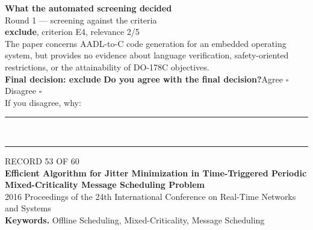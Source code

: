 \documentclass[11pt,a4paper]{article}
\begin{document}
\vspace{3mm}
\vspace{2.5mm}
{\small\textbf{What the automated screening decided}}\\[2mm]
{\footnotesize\color{soft}Round 1 --- screening against the criteria}\\[0.5mm]
{\small\textbf{exclude}, criterion E4, relevance 2/5}\\[0.5mm]
{\small The paper concerns AADL-to-C code generation for an embedded operating system, but provides no evidence about language verification, safety-oriented restrictions, or the attainability of DO-178C objectives.}\\[2.5mm]
{\small\textbf{Final decision: exclude}}
\vspace{2mm}
{\small\textbf{Do you agree with the final decision?}\quad{}Agree $\square$\qquad{}Disagree $\square$}\\[1mm]
{\footnotesize\color{soft}If you disagree, why:}\\[1mm]
\color{rule}\rule{\linewidth}{0.3pt}\\[3mm]\rule{\linewidth}{0.3pt}\color{black}
\clearpage
{\color{soft}\footnotesize RECORD 53 OF 60}\\[1mm]
{\large\bfseries Efficient Algorithm for Jitter Minimization in Time-Triggered Periodic Mixed-Criticality Message Scheduling Problem}\\[1.5mm]
{\color{soft}\small 2016 \textperiodcentered{} Proceedings of the 24th International Conference on Real-Time Networks and Systems}\\[2mm]
{\small\textbf{Keywords.} Offline Scheduling, Mixed-Criticality, Message Scheduling}\\[2mm]
\end{document}
